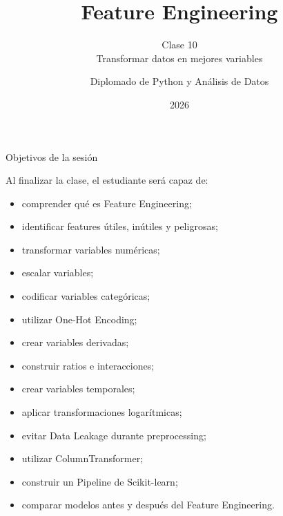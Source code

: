 \documentclass[aspectratio=169,11pt]{beamer}
\title{Feature Engineering}
\subtitle{
Clase 10\\
Transformar datos en mejores variables
}
\author{
Diplomado de Python y Análisis de Datos
}
\institute{
Universidad Marista
}
\date{2026}
\begin{document}

\begin{frame}
    \titlepage
\end{frame}


\begin{frame}{Objetivos de la sesión}

Al finalizar la clase, el estudiante será capaz de:

\begin{itemize}

    \item comprender qué es Feature Engineering;

    \item identificar features útiles, inútiles y peligrosas;

    \item transformar variables numéricas;

    \item escalar variables;

    \item codificar variables categóricas;

    \item utilizar One-Hot Encoding;

    \item crear variables derivadas;

    \item construir ratios e interacciones;

    \item crear variables temporales;

    \item aplicar transformaciones logarítmicas;

    \item evitar Data Leakage durante preprocessing;

    \item utilizar ColumnTransformer;

    \item construir un Pipeline de Scikit-learn;

    \item comparar modelos antes y después del Feature Engineering.

\end{itemize}

\end{frame}
\end{document}
